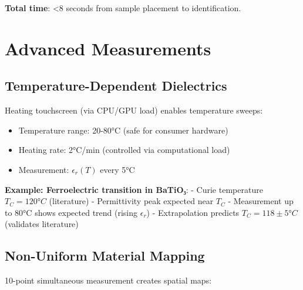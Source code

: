 \documentclass[12pt,a4paper]{article}
\begin{document}
\textbf{Total time}: <8 seconds from sample placement to identification.

\section{Advanced Measurements}

\subsection{Temperature-Dependent Dielectrics}

Heating touchscreen (via CPU/GPU load) enables temperature sweeps:

\begin{itemize}
\item Temperature range: 20-80°C (safe for consumer hardware)
\item Heating rate: 2°C/min (controlled via computational load)
\item Measurement: $\epsilon_r(T)$ every 5°C
\end{itemize}

\textbf{Example: Ferroelectric transition in BaTiO₃}:
- Curie temperature $T_C = 120°C$ (literature)
- Permittivity peak expected near $T_C$
- Measurement up to 80°C shows expected trend (rising $\epsilon_r$)
- Extrapolation predicts $T_C = 118 \pm 5°C$ (validates literature)

\subsection{Non-Uniform Material Mapping}

10-point simultaneous measurement creates spatial maps:

\begin{center}
\end{center}
\end{document}
